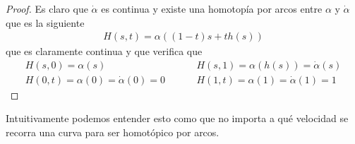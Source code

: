 \begin{ejemplo}
\begin{enumerate}
        \begin{proof}
            Es claro que $\dot{\alpha}$ es continua y existe una homotopía por arcos entre $\alpha$ y $\dot{\alpha}$ que es la siguiente
            \begin{gather*}
                H(s,t) = \alpha((1-t)s + th(s))
            \end{gather*}
            que es claramente continua y que verifica que 
            \begin{align*}
                H(s,0) = \alpha(s) \hspace{1cm} & H(s,1) = \alpha(h(s)) = \dot{\alpha}(s)\\
                H(0,t) = \alpha(0)=\dot{\alpha}(0)=0 \hspace{1cm} & H(1,t) = \alpha(1) = \dot{\alpha}(1)=1
            \end{align*}
        \end{proof}
        Intuitivamente podemos entender esto como que no importa a qué velocidad se recorra una curva para ser homotópico por arcos.
    \end{enumerate} 
\end{ejemplo}

